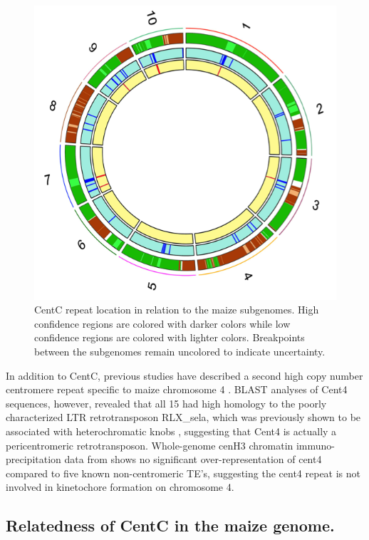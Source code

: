 \begin{figure}
  \includegraphics{circos.png}
\caption{CentC repeat location in relation to the maize subgenomes.  High confidence regions are colored with darker colors while low confidence regions are colored with lighter colors.  Breakpoints between the subgenomes remain uncolored to indicate uncertainty.}
\label{circos}    
\end{figure}

In addition to CentC, previous studies have described a second high copy number centromere repeat specific to maize chromosome 4 \citep{Page2001}.   BLAST analyses of Cent4 sequences, however, revealed that all 15 had high homology to the poorly characterized LTR retrotransposon RLX\_sela, which was previously shown to be associated with heterochromatic  knobs \citep{Tenaillon2011, Chia2012}, suggesting that Cent4 is actually a pericentromeric retrotransposon.  Whole-genome cenH3 chromatin immuno-precipitation data from  \citet{Wolfgruber2009} shows no significant over-representation of cent4 compared to five known non-centromeric TE’s, suggesting the cent4 repeat is not involved in kinetochore formation on chromosome 4.
	
\subsection*{Relatedness of CentC in the maize genome.}

